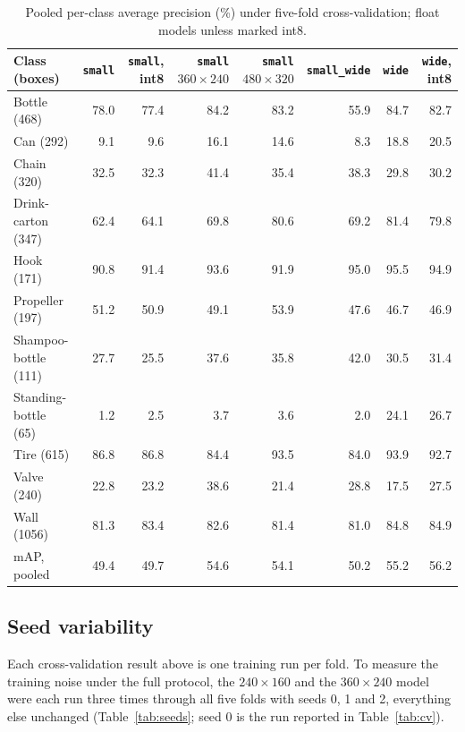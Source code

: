 \documentclass[11pt,a4paper]{article}
\newcommand{\cfg}[1]{\texttt{#1}}
\begin{document}
\begin{table}[h]
  \centering
  \small
  \setlength{\tabcolsep}{3pt}
  \footnotesize
  \begin{tabular}{lrrrrrrr}
    \toprule
    Class (boxes) & \cfg{small} & \cfg{small}, int8 & \cfg{small} $360{\times}240$ & \cfg{small} $480{\times}320$ & \cfg{small\_wide} & \cfg{wide} & \cfg{wide}, int8 \\
    \midrule
    Bottle (468) & 78.0 & 77.4 & 84.2 & 83.2 & 55.9 & 84.7 & 82.7 \\
    Can (292) & 9.1 & 9.6 & 16.1 & 14.6 & 8.3 & 18.8 & 20.5 \\
    Chain (320) & 32.5 & 32.3 & 41.4 & 35.4 & 38.3 & 29.8 & 30.2 \\
    Drink-carton (347) & 62.4 & 64.1 & 69.8 & 80.6 & 69.2 & 81.4 & 79.8 \\
    Hook (171) & 90.8 & 91.4 & 93.6 & 91.9 & 95.0 & 95.5 & 94.9 \\
    Propeller (197) & 51.2 & 50.9 & 49.1 & 53.9 & 47.6 & 46.7 & 46.9 \\
    Shampoo-bottle (111) & 27.7 & 25.5 & 37.6 & 35.8 & 42.0 & 30.5 & 31.4 \\
    Standing-bottle (65) & 1.2 & 2.5 & 3.7 & 3.6 & 2.0 & 24.1 & 26.7 \\
    Tire (615) & 86.8 & 86.8 & 84.4 & 93.5 & 84.0 & 93.9 & 92.7 \\
    Valve (240) & 22.8 & 23.2 & 38.6 & 21.4 & 28.8 & 17.5 & 27.5 \\
    Wall (1056) & 81.3 & 83.4 & 82.6 & 81.4 & 81.0 & 84.8 & 84.9 \\
    \midrule
    mAP, pooled & 49.4 & 49.7 & 54.6 & 54.1 & 50.2 & 55.2 & 56.2 \\
    \bottomrule
  \end{tabular}
  \caption{Pooled per-class average precision (\%) under five-fold
  cross-validation; float models unless marked int8.}
  \label{tab:cvclass}
\end{table}

\subsection{Seed variability}
\label{sec:seeds}

Each cross-validation result above is one training run per fold. To
measure the training noise under the full protocol, the $240 \times 160$
and the $360 \times 240$ model were each run three times
through all five folds with seeds 0, 1 and 2, everything else unchanged
(Table~\ref{tab:seeds}; seed 0 is the run reported in Table~\ref{tab:cv}).
\end{document}
